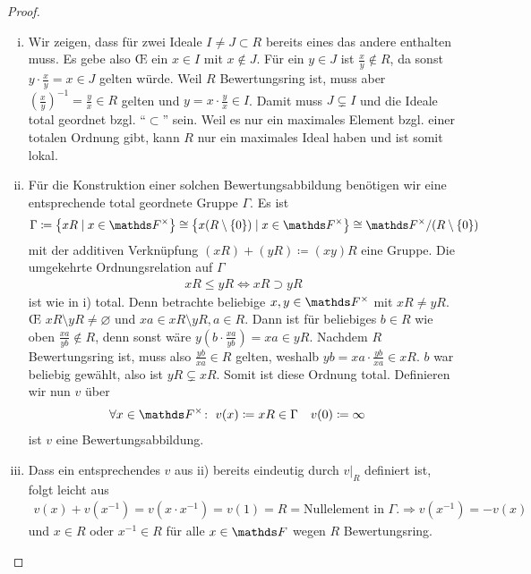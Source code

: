 \documentclass[ngerman,fontsize=11pt, paper=a4, parskip=half, titlepage=true, toc=bib]{scrartcl}
\begin{document}
\begin{Lem}
  \begin{proof}
    \begin{enumerate}[i)]
    \item Wir zeigen, dass für zwei Ideale $I\neq J\subset R$ bereits
      eines das andere enthalten muss. Es gebe also \OE{} ein $x\in I$
      mit $x\not\in J$. Für ein $y\in J$ ist $\frac{x}{y}\not\in R$,
      da sonst $y\cdot \frac{x}{y}=x\in J$ gelten würde.
      Weil $R$ Bewertungsring ist, muss aber
      $(\frac{x}{y})^{-1}=\frac{y}{x}\in R$ gelten und $y=x\cdot
      \frac{y}{x}\in I$. Damit muss $J\subsetneq I$ und die
      Ideale total geordnet bzgl. \enquote{$\subset$} sein.
      Weil es nur ein maximales Element bzgl. einer totalen Ordnung
      gibt, kann $R$ nur ein maximales Ideal haben und ist somit
      lokal.
    \item Für die Konstruktion einer solchen Bewertungsabbildung
      benötigen wir eine entsprechende total geordnete Gruppe $\Gamma$.
      Es ist
      \begin{gather*}
        \Gamma \coloneqq \left\{ xR \mid x\in \Fx \right\}
        \cong\left\{ x(R\setminus \{0\})\mid x\in\Fx \right\}
        \cong \Fx/(R\setminus \{0\})
      \end{gather*}
      mit der additiven Verknüpfung $(xR)+(yR)\coloneqq(xy)R$
      eine Gruppe. Die umgekehrte Ordnungsrelation
      auf $\Gamma$
      \begin{gather*}
        xR\leq yR \Longleftrightarrow xR \supset yR
      \end{gather*}
      ist wie in i) total.
      Denn betrachte beliebige $x,y\in\Fx$ mit $xR\neq yR$.
      \OE{} $xR\setminus yR\neq \varnothing$ und $xa\in xR\setminus yR,
      a \in R$. Dann ist für beliebiges $b\in R$ wie oben 
      $\frac{xa}{yb}\not\in R$, denn sonst wäre 
      $y(b\cdot\frac{xa}{yb})=xa \in yR$.
      Nachdem $R$ Bewertungsring ist, muss also $\frac{yb}{xa}\in R$
      gelten, weshalb $yb=xa\cdot \frac{yb}{xa}\in xR$. $b$ war beliebig
      gewählt, also ist $yR\subsetneq xR$.
      Somit ist diese Ordnung total.
      Definieren wir nun $v$ über
      \begin{align*}
        \forall x\in \Fx\colon\;v(x)&\coloneqq xR\in\Gamma
        &v(0)&\coloneqq \infty
      \end{align*}
      ist $v$ eine Bewertungsabbildung. 
    \item Dass ein entsprechendes $v$ aus ii) bereits eindeutig
      durch $v|_{R}$ definiert ist, folgt leicht aus
      \begin{gather*}
        v(x)+v(x^{-1}) = v(x\cdot x^{-1}) = v(1) = R  =
        \text{Nullelement in }\Gamma.
        \Longrightarrow v(x^{-1})=-v(x)
      \end{gather*}
      und $x\in R$ oder $x^{-1}\in R$ für alle $x\in\F$ wegen $R$
      Bewertungsring.
    \end{enumerate}
  \end{proof}
\end{Lem}
\end{document}
